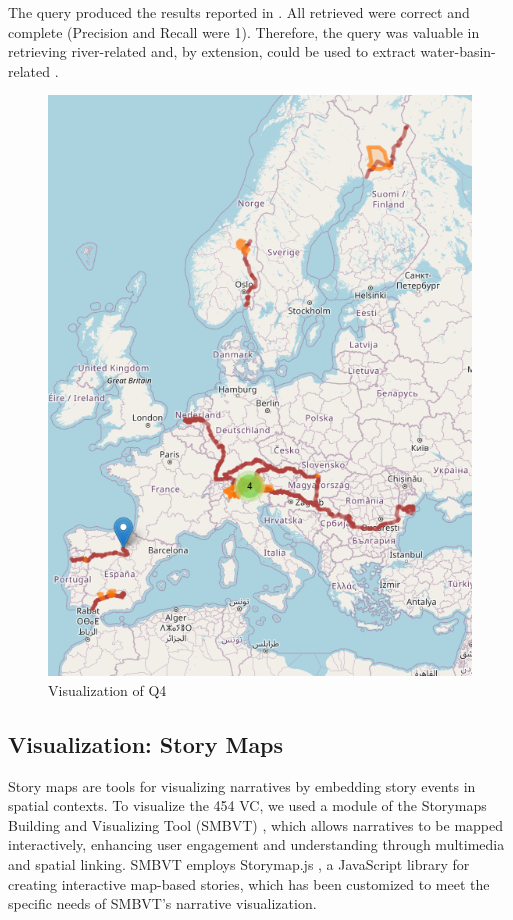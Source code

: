 The query produced the results reported in . All  retrieved were correct and complete (Precision and Recall were 1). Therefore, the query was valuable in retrieving river-related  and, by extension, could be used to extract water-basin-related .

\begin{figure}[h!tb]
    \centerline {\includegraphics[scale=0.6]{img/rivers.png}}
    \caption{Visualization of Q4}
    \label{fig:rivers}
\end{figure}


\subsection{Visualization: Story Maps}\label{VII-subsec:moving-visualization}

Story maps are tools for visualizing narratives by embedding story events in spatial contexts. To visualize the 454 VC, we used a module of the Storymaps Building and Visualizing Tool (SMBVT) \cite{bartalesiWebToolCreate2023b}, which allows narratives to be mapped interactively, enhancing user engagement and understanding through multimedia and spatial linking. SMBVT employs Storymap.js \cite{zhaoJakobzhaoStorymap2024}, a JavaScript library for creating interactive map-based stories, which has been customized to meet the specific needs of SMBVT’s narrative visualization.

